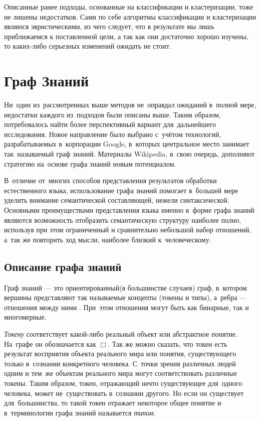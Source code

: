 Описанные ранее подходы, основанные на классификации и кластеризации, тоже не лишены недостатков.
Сами по себе алгоритмы классификации и кластеризации являюся эвристическими, из чего следует, что
в результате мы лишь приближаемся к поставленной цели, а так как они достаточно хорошо изучены, то 
каких-либо серьезных изменений ожидать не стоит.

\section {Граф Знаний}
 
Ни~один из~рассмотренных выше методов не~оправдал ожиданий в~полной мере, 
недостатки каждого из~подходов были описаны выше.
Таким образом, потребовалось найти более перспективный вариант для~дальнейшего исследования.
Новое направление было выбрано с~учётом технологий, 
разрабатываемых в~корпорации Google, в~которых центральное место занимает  так~называемый граф знаний.
Материалы Wikipedia, в~свою очередь, дополняют стратегию на~основе графа знаний новым потенциалом.

В~отличие от~многих способов представления результатов обработки естественного языка,
 использование графа знаний помогает в~большей мере уделить внимание семантической составляющей, нежели синтаксической. 
Основными преимуществами представления языка именно в~форме графа знаний являются 
возможность отобразить семантическую структуру наиболее полно, 
используя при этом ограниченный и сравнительно небольшой набор отношений, 
а~так же повторить ход мысли, наиболее близкий к~человеческому.

\subsection {Описание графа знаний}

Граф знаний --- это ориентированный(в большинстве случаев) граф, 
в~котором вершины представляют так называемые концепты (токены и типы),
а~ребра --- отношения между ними \cite{knowledge_graph}.
При~этом отношения могут быть как бинарные, так и многомерные. 

\textsl{Токену} соответствует какой-либо реальный объект или абстрактное понятие.
На~графе он обозначается как $\Box$. 
Так же можно сказать, что токен есть результат восприятия объекта реального мира или понятия, 
существующего только в~сознании конкретного человека.
С~точки зрения различных людей одним и тем~же объектам реального мира могут соответствовать различные токены.
Таким образом, токен, отражающий нечто существующее для~одного человека, может не~существовать в~сознании другого. 
Но если он существует для~большинства, то такой токен отражает некоторое общее понятие и 
в~терминологии графа знаний называется \textsl{типом}.


